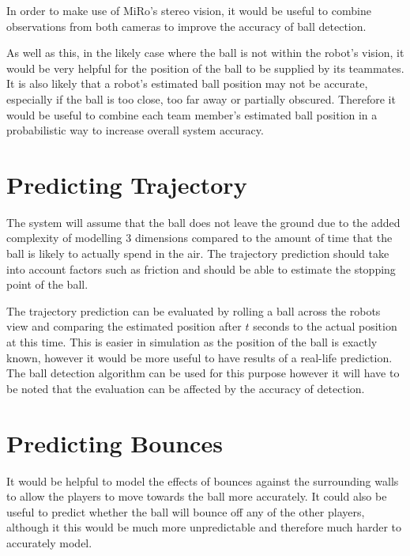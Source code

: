 In order to make use of MiRo's stereo vision, it would be useful to combine observations from both cameras to improve the accuracy of ball detection. 

As well as this, in the likely case where the ball is not within the robot's vision, it would be very helpful for the position of the ball to be supplied by its teammates. It is also likely that a robot's estimated ball position may not be accurate, especially if the ball is too close, too far away or partially obscured. Therefore it would be useful to combine each team member's estimated ball position in a probabilistic way to increase overall system accuracy.

\section{Predicting Trajectory}

The system will assume that the ball does not leave the ground due to the added complexity of modelling 3 dimensions compared to the amount of time that the ball is likely to actually spend in the air. The trajectory prediction should take into account factors such as friction and should be able to estimate the stopping point of the ball. 

The trajectory prediction can be evaluated by rolling a ball across the robots view and comparing the estimated position after $t$ seconds to the actual position at this time. This is easier in simulation as the position of the ball is exactly known, however it would be more useful to have results of a real-life prediction. The ball detection algorithm can be used for this purpose however it will have to be noted that the evaluation can be affected by the accuracy of detection. 

\section{Predicting Bounces}

It would be helpful to model the effects of bounces against the surrounding walls to allow the players to move towards the ball more accurately. It could also be useful to predict whether the ball will bounce off any of the other players, although it this would be much more unpredictable and therefore much harder to accurately model. 
